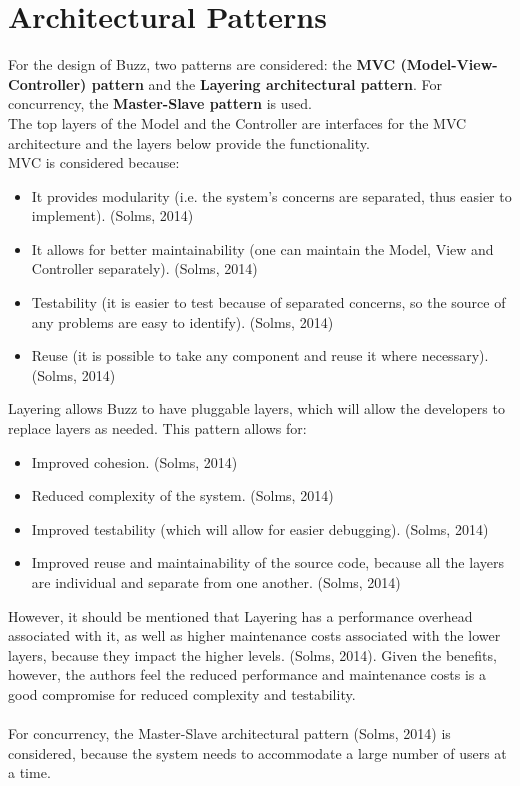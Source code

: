 \documentclass[a4paper,12pt]{report}
\begin{document}
	\section{Architectural Patterns}
		For the design of Buzz, two patterns are considered: the \textbf{MVC (Model-View-Controller) pattern} and the \textbf{Layering architectural pattern}. For concurrency, the \textbf{Master-Slave pattern} is used.\\
		The top layers of the Model and the Controller are interfaces for the MVC architecture and the layers below provide the functionality.\\
		MVC is considered because:
		\begin{itemize}
			\item It provides modularity (i.e. the system's concerns are separated, thus easier to implement). (Solms, 2014)
			\item It allows for better maintainability (one can maintain the Model, View and Controller separately). (Solms, 2014)
			\item Testability (it is easier to test because of separated concerns, so the source of any problems are easy to identify). (Solms, 2014)
			\item Reuse (it is possible to take any component and reuse it where necessary). (Solms, 2014)
		\end{itemize} 
		Layering allows Buzz to have pluggable layers, which will allow the developers to replace layers as needed.
		This pattern allows for: 
		\begin{itemize}
			\item Improved cohesion. (Solms, 2014)
			\item Reduced complexity of the system. (Solms, 2014)
			\item Improved testability (which will allow for easier debugging). (Solms, 2014)
			\item Improved reuse and maintainability of the source code, because all the layers are individual and separate from one another. (Solms, 2014)
		\end{itemize}
		However, it should be mentioned that Layering has a performance overhead associated with it, as well as higher maintenance costs associated with the lower layers, because they impact the higher levels. (Solms, 2014). Given the benefits, however, the authors feel the reduced performance and maintenance costs is a good compromise for reduced complexity and testability.\\
		\\
		For concurrency, the Master-Slave architectural pattern (Solms, 2014) is considered, because the system needs to accommodate a large number of users at a time.
	\newpage
\end{document}
